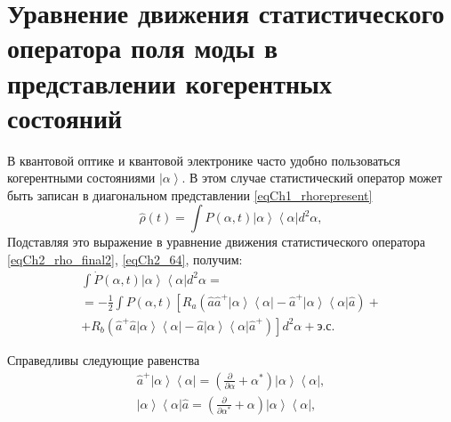 \section{Уравнение движения статистического оператора поля моды в
  представлении когерентных состояний}
В квантовой оптике и квантовой электронике часто удобно пользоваться
когерентными состояниями $\left|\alpha\right>$.  В этом случае
статистический оператор может быть записан в диагональном
представлении \eqref{eqCh1_rhorepresent}  
\begin{equation}
\hat{\rho}\left(t\right) = \int
P\left(\alpha, t\right)\left|\alpha\right>\left<\alpha\right| d^2 \alpha,
\label{eqCh2_65}
\end{equation}
Подставляя это выражение в уравнение движения статистического
оператора \eqref{eqCh2_rho_final2}, \ref{eqCh2_64}, получим: 
\begin{eqnarray}
\int \dot{P}\left(\alpha, t\right)\left|\alpha\right>\left<\alpha\right|
d^2 \alpha  = 
\nonumber \\
= -\frac{1}{2}\int P\left(\alpha, t\right)\left[R_a
\left(\hat{a}\hat{a}^{+}\left|\alpha\right>\left<\alpha\right|-\hat{a}^{+}\left|\alpha\right>\left<\alpha\right|\hat{a}\right)
\right. +
\nonumber \\
+
\left.
R_b
\left(\hat{a}^{+}\hat{a}\left|\alpha\right>\left<\alpha\right|-\hat{a}\left|\alpha\right>\left<\alpha\right|\hat{a}^{+}\right)
\right]d^2 \alpha +\mbox{э.с.}
\label{eqCh2_66}
\end{eqnarray}

Справедливы следующие равенства
\begin{eqnarray}
\hat{a}^{+}\left|\alpha\right>\left<\alpha\right| = 
\left(\frac{\partial}{\partial \alpha} +
\alpha^{*}\right)\left|\alpha\right>\left<\alpha\right|, 
\nonumber \\
\left|\alpha\right>\left<\alpha\right|\hat{a} = 
\left(\frac{\partial}{\partial \alpha^{*}} +
\alpha\right)\left|\alpha\right>\left<\alpha\right|, 
\label{eqCh2_67}
\end{eqnarray}

